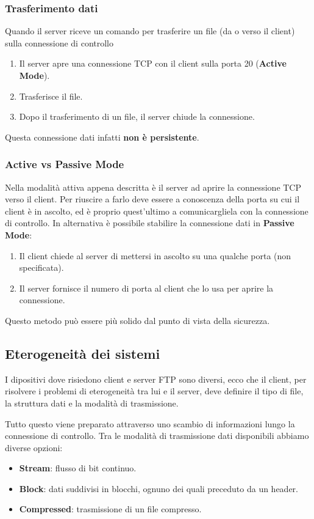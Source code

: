\subsubsection{Trasferimento dati}
Quando il server riceve un comando per trasferire un file (da o verso 
il client) sulla connessione di controllo
\begin{enumerate}
	\item Il server apre una connessione TCP con il client sulla 
		porta 20 (\textbf{Active Mode}).
	\item Trasferisce il file.
	\item Dopo il trasferimento di un file, il server chiude la 
		connessione.
\end{enumerate}
Questa connessione dati infatti \textbf{non è persistente}.

\subsubsection{Active vs Passive Mode}
Nella modalità attiva appena descritta è il server ad aprire la 
connessione TCP verso il client. Per riuscire a farlo deve essere a 
conoscenza della porta su cui il client è in ascolto, ed è proprio 
quest'ultimo a comunicargliela con la connessione di controllo. In
alternativa è possibile stabilire la connessione dati in 
\textbf{Passive Mode}:
\begin{enumerate}
	\item Il client chiede al server di mettersi in ascolto su una
		qualche porta (non specificata).
	\item Il server fornisce il numero di porta al client che lo usa 
		per aprire la connessione.
\end{enumerate}
Questo metodo può essere più solido dal punto di vista della sicurezza.

\subsection{Eterogeneità dei sistemi}
I dipositivi dove risiedono client e server FTP sono diversi, ecco che 
il client, per risolvere i problemi di eterogeneità tra lui e il
server, deve definire il tipo di file, la struttura dati e la modalità 
di trasmissione.

Tutto questo viene preparato attraverso uno scambio di informazioni 
lungo la connessione di controllo. Tra le modalità di trasmissione dati
disponibili abbiamo diverse opzioni:
\begin{itemize}
	\item \textbf{Stream}: flusso di bit continuo.
	\item \textbf{Block}: dati suddivisi in blocchi, ognuno dei quali 
		preceduto da un header.
	\item \textbf{Compressed}: trasmissione di un file compresso.
\end{itemize}

